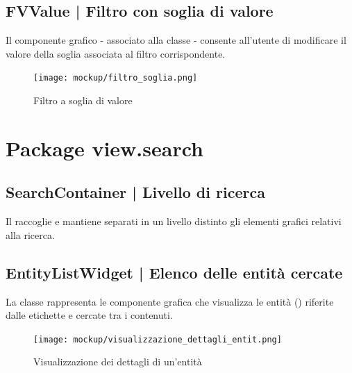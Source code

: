 \documentclass[10pt,a4paper,headinclude,footinclude,hidelinks]{scrreprt} %
\begin{document}
	\subsection[FVValue]{FVValue | Filtro con soglia di valore}
	\label{sec:stage:design:view.filter:value-filter}
	Il componente grafico - associato alla classe \textit{} - consente all'utente di modificare il valore della soglia associata al filtro corrispondente.

	\begin{figure}[ht]
		\begin{center}
	    	\texttt{[image: mockup/filtro\_soglia.png]}
			\label{gfx:mockup:filter:value}
			\caption{Filtro a soglia di valore}
		\end{center}
	\end{figure}

	\section{Package view.search}
	\label{sec:stage:design:view.search}

	\subsection[SearchContainer]{SearchContainer | Livello di ricerca}
	\label{sec:stage:design:view.search:search-container}
	Il \textit{} raccoglie e mantiene separati in un livello distinto gli elementi grafici relativi alla ricerca.

	\subsection[EntityListWidget]{EntityListWidget | Elenco delle entità cercate}
	\label{sec:stage:design:view.search:search-entity-list}
	La classe \textit{} rappresenta le componente grafica che visualizza le entità (\textit{}) riferite dalle etichette e cercate tra i contenuti.

	\begin{figure}[ht]
		\begin{center}
	    	\texttt{[image: mockup/visualizzazione\_dettagli\_entit.png]}
			\label{gfx:mockup:entity-list}
			\caption{Visualizzazione dei dettagli di un'entità}
		\end{center}
	\end{figure}
\end{document}
